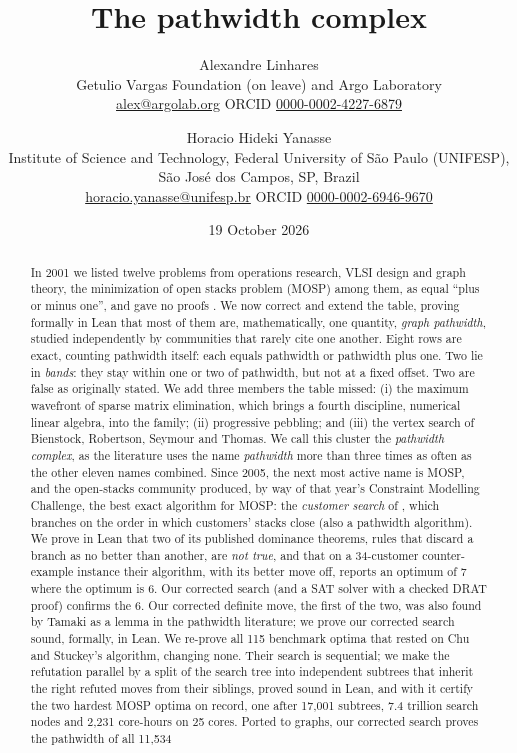 \documentclass[11pt,letterpaper]{article}
\title{The pathwidth complex}
\author{Alexandre Linhares\\{\small Getulio Vargas Foundation (on leave) and Argo Laboratory}\\{\small \href{mailto:alex@argolab.org}{alex@argolab.org} \quad ORCID \href{https://orcid.org/0000-0002-4227-6879}{0000-0002-4227-6879}} \and
Horacio Hideki Yanasse\\{\small Institute of Science and Technology, Federal University of São Paulo (UNIFESP), São José dos Campos, SP, Brazil}\\{\small \href{mailto:horacio.yanasse@unifesp.br}{horacio.yanasse@unifesp.br} \quad ORCID \href{https://orcid.org/0000-0002-6946-9670}{0000-0002-6946-9670}}}
\date{19 October 2026}
\numberwithin{figure}{section}
\numberwithin{table}{section}
\theoremstyle{plain}
\theoremstyle{definition}
\theoremstyle{remark}
\begin{document}
\maketitle

\begin{abstract}
\noindent
In 2001 we listed twelve problems from operations research, VLSI
design and graph theory, the minimization of open stacks problem (MOSP) among
them, as equal ``plus or minus one'', and gave no proofs
\citep{Linhares2001,LY2002}. We now correct and extend the table, proving formally in Lean that most of
them are, mathematically, one quantity, \emph{graph pathwidth}, studied
independently by communities that rarely cite one another. Eight rows are exact,
counting pathwidth itself: each equals pathwidth or pathwidth plus one. Two lie
in \emph{bands}: they stay within one or two of pathwidth, but not at a fixed
offset. Two are false as originally stated. We add three members the table missed:
(i) the maximum wavefront of sparse matrix elimination, which brings a fourth
discipline, numerical linear algebra, into the family; (ii) progressive
pebbling; and (iii) the vertex search of Bienstock, Robertson, Seymour and
Thomas. We call this cluster the
\emph{pathwidth complex}, as the literature uses the name \emph{pathwidth} more
than three times as often as the other eleven names combined. Since 2005, the
next most active name is MOSP, and the open-stacks community produced, by way
of that year's Constraint Modelling Challenge, the best exact algorithm for
MOSP: the \emph{customer search} of \citet{ChuStuckey2009}, which branches on the order in which customers' stacks close (also a
pathwidth algorithm). We prove in Lean that two of its published dominance theorems,
rules that discard a branch as no better than another, are \emph{not true},
and that on a 34-customer counter-example instance their algorithm, with its better move off, reports an
optimum of 7 where the optimum is 6. Our corrected search (and a SAT solver with a checked DRAT proof) confirms the 6. Our corrected definite move,
the first of the two, was also found by Tamaki as a lemma
\citep[Lemma~1]{Kitsunai2016} in the pathwidth literature; we prove our
corrected search sound, formally, in Lean. We re-prove all 115 benchmark
optima that rested on Chu and Stuckey's algorithm, changing none. Their search
is sequential; we make the refutation parallel by a split of the search tree
into independent subtrees that inherit the right refuted moves from their
siblings, proved sound in Lean, and with it certify the two hardest MOSP
optima on record, one after 17,001 subtrees, 7.4 trillion search nodes and 2,231 core-hours on 25 cores. Ported to graphs, our corrected search proves the pathwidth of all 11,534

\end{abstract}
\end{document}
